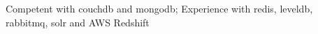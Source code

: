 \item Competent with couchdb and mongodb; Experience with redis, leveldb, rabbitmq, solr and AWS Redshift
